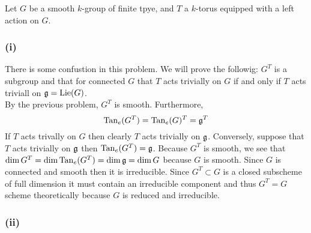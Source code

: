 \documentclass[12pt]{article}
\begin{document}
Let $G$ be a smooth $k$-group of finite tpye, and $T$ a $k$-torus equipped with a left action on $G$. 

\subsubsection{(i)}

There is some confustion in this problem. We will prove the followig: $G^T$ is a subgroup and that for connected $G$ that $T$ acts trivially on $G$ if and only if $T$ acts triviall on $\mathfrak{g} = \mathrm{Lie}(G)$.
\bigskip\\
By the previous problem, $G^T$ is smooth. Furthermore, 
\[ \mathrm{Tan}_e(G^T) = \mathrm{Tan}_e(G)^T = \mathfrak{g}^T \]
If $T$ acts trivally on $G$ then clearly $T$ acts trivially on $\mathfrak{g}$. Conversely, suppose that $T$ acts trivially on $\mathfrak{g}$ then $\mathrm{Tan}_e(G^T) = \mathfrak{g}$. Because $G^T$ is smooth, we see that $\dim{G^T} = \dim{\mathrm{Tan}_e(G^T)} = \dim{\mathfrak{g}} = \dim{G}$ because $G$ is smooth. Since $G$ is connected and smooth then it is irreducible. Since $G^T \subset G$ is a closed subscheme of full dimension it must contain an irreducible component and thus $G^T = G$ scheme theoretically because $G$ is reduced and irreducible. 

\subsubsection{(ii)}
\end{document}
